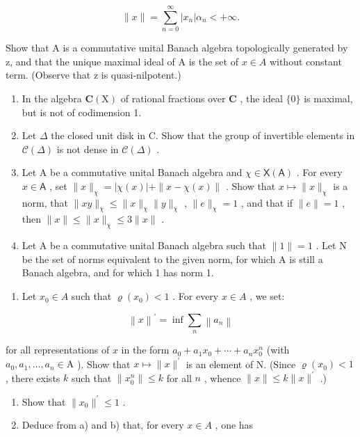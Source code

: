 \[
\| x \| = \sum_ {n = 0} ^ {\infty} | x _ {n} | \alpha_ {n} <   + \infty .
\]

Show that A is a commutative unital Banach algebra topologically generated by z, and that the unique maximal ideal of A is the set of \(x \in A\) without constant term. (Observe that z is quasi-nilpotent.)

\begin{enumerate}
\def\labelenumi{\arabic{enumi})}
\setcounter{enumi}{4}
\item
  In the algebra \(\mathbf{C}(\mathrm{X})\) of rational fractions over \(\mathbf{C}\) , the ideal \(\{0\}\) is maximal, but is not of codimension 1.
\item
  Let \(\Delta\) the closed unit disk in C. Show that the group of invertible elements in \(\mathcal{C}(\Delta)\) is not dense in \(\mathcal{C}(\Delta)\) .
\item
  Let A be a commutative unital Banach algebra and \(\chi \in \mathsf{X}(\mathsf{A})\) . For every \(x \in \mathsf{A}\) , set \(\|x\|_{\chi} = |\chi(x)| + \|x - \chi(x)\|\) . Show that \(x \mapsto \|x\|_{\chi}\) is a norm, that \(\|xy\|_{\chi} \leqslant \|x\|_{\chi}\|y\|_{\chi}\) , \(\|e\|_{\chi} = 1\) , and that if \(\|e\| = 1\) , then \(\|x\| \leqslant \|x\|_{\chi} \leqslant 3\|x\|\) .
\item
  Let A be a commutative unital Banach algebra such that \(\|1\| = 1\) . Let N be the set of norms equivalent to the given norm, for which A is still a Banach algebra, and for which 1 has norm 1.
\end{enumerate}

\begin{enumerate}
\def\labelenumi{\alph{enumi})}
\tightlist
\item
  Let \(x_{0} \in A\) such that \(\varrho(x_{0}) < 1\) . For every \(x \in A\) , we set:
\end{enumerate}

\[
\left\| x \right\| ^ {\prime} = \inf \sum_ {n} \left\| a _ {n} \right\|
\]

for all representations of \(x\) in the form \(a_0 + a_1 x_0 + \cdots + a_n x_0^n\) (with \(a_0, a_1, \ldots, a_n \in \mathrm{A}\) ). Show that \(x \mapsto \|x\|^{\prime}\) is an element of N. (Since \(\varrho(x_0) < 1\) , there exists \(k\) such that \(\|x_0^n\| \leqslant k\) for all \(n\) , whence \(\|x\| \leqslant k \|x\|^{\prime}\) .)

\begin{enumerate}
\def\labelenumi{\alph{enumi})}
\setcounter{enumi}{1}
\item
  Show that \(\|x_{0}\|^{\prime}\leqslant1\) .
\item
  Deduce from a) and b) that, for every \(x \in A\) , one has
\end{enumerate}

